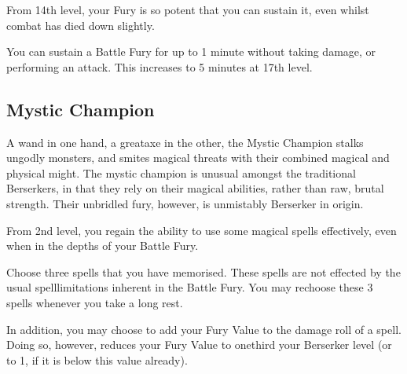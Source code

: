 {
	From 14th level, your Fury is so potent that you can sustain it, even whilst combat has died down slightly. 
	
	You can sustain a Battle Fury for up to 1 minute without taking damage, or performing an attack. This increases to 5 minutes at 17th level.
}

\subsection*{Mystic Champion}

A wand in one hand, a greataxe in the other, the Mystic Champion stalks ungodly monsters, and smites magical threats with their combined magical and physical might. The mystic champion is unusual amongst the traditional Berserkers, in that they rely on their magical abilities, rather than raw, brutal strength. Their unbridled fury, however, is unmistably Berserker in origin. 



{
From 2nd level, you regain the ability to use some magical spells effectively, even when in the depths of your Battle Fury. 

Choose three spells that you have memorised. These spells are not effected  by the usual spell\minus{}limitations inherent in the Battle Fury. You may re\minus{}choose these 3 spells whenever you take a long rest. 

In addition, you may choose to add your Fury Value to the damage roll of a spell. Doing so, however, reduces your Fury Value to one\minus{}third your Berserker level (or to 1, if it is below this value already). 

}


